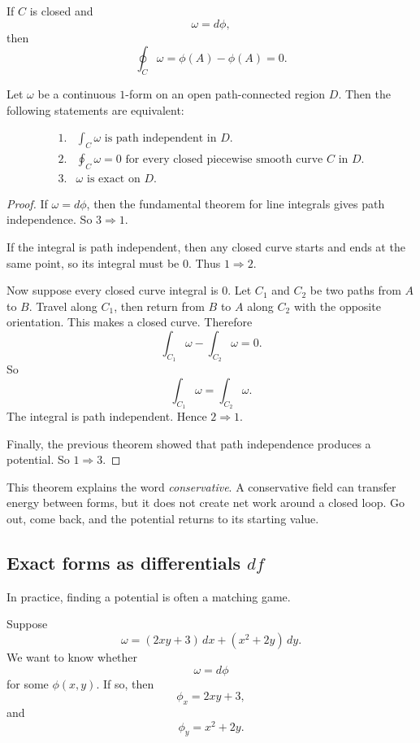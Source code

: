 If \(C\) is closed and
\[
    \omega=d\phi,
\]
then
\[
    \oint_C \omega=\phi(A)-\phi(A)=0.
\]

\begin{theorem}
Let \(\omega\) be a continuous \(1\)-form on an open path-connected region \(D\).
Then the following statements are equivalent:

\[
\begin{array}{ll}
1. & \displaystyle \int_C\omega \text{ is path independent in }D.\\[2mm]
2. & \displaystyle \oint_C\omega=0 \text{ for every closed piecewise smooth curve }C
      \text{ in }D.\\[2mm]
3. & \omega \text{ is exact on }D.
\end{array}
\]
\end{theorem}

\begin{proof}
If \(\omega=d\phi\), then the fundamental theorem for line integrals gives path
independence.  So \(3\Rightarrow1\).

If the integral is path independent, then any closed curve starts and ends at the same
point, so its integral must be \(0\).  Thus \(1\Rightarrow2\).

Now suppose every closed curve integral is \(0\).  Let \(C_1\) and \(C_2\) be two paths
from \(A\) to \(B\).  Travel along \(C_1\), then return from \(B\) to \(A\) along \(C_2\)
with the opposite orientation.  This makes a closed curve.  Therefore
\[
    \int_{C_1}\omega-\int_{C_2}\omega=0.
\]
So
\[
    \int_{C_1}\omega=\int_{C_2}\omega.
\]
The integral is path independent.  Hence \(2\Rightarrow1\).

Finally, the previous theorem showed that path independence produces a potential.
So \(1\Rightarrow3\).
\end{proof}

This theorem explains the word \emph{conservative}.  A conservative field can transfer
energy between forms, but it does not create net work around a closed loop.  Go out,
come back, and the potential returns to its starting value.

\subsection{Exact forms as differentials \(df\)}

In practice, finding a potential is often a matching game.

Suppose
\[
    \omega=(2xy+3)\,dx+(x^2+2y)\,dy.
\]
We want to know whether
\[
    \omega=d\phi
\]
for some \(\phi(x,y)\).  If so, then
\[
    \phi_x=2xy+3,
\]
and
\[
    \phi_y=x^2+2y.
\]

